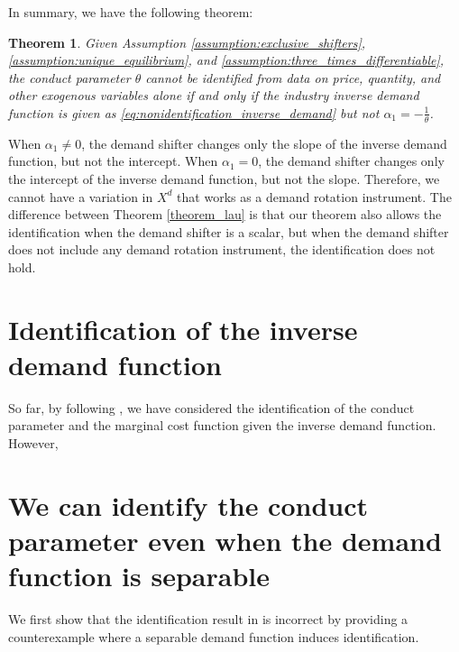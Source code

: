 \documentclass[11pt, a4paper]{article}
\newtheorem{theorem}{Theorem}
\theoremstyle{remark}
\begin{document}
In summary, we have the following theorem:
\begin{theorem}\label{theorem:identification_characterization}
    Given Assumption \ref{assumption:exclusive_shifters}, \ref{assumption:unique_equilibrium}, and \ref{assumption:three_times_differentiable}, the conduct parameter $\theta$ cannot be identified from data on price, quantity, and other exogenous variables alone if and only if the industry inverse demand function is given as \eqref{eq:nonidentification_inverse_demand} but not $\alpha_1 = -\frac{1}{\theta}$.
\end{theorem}
When $\alpha_1 \ne 0$, the demand shifter changes only the slope of the inverse demand function, but not the intercept.
When $\alpha_1 = 0$, the demand shifter changes only the intercept of the inverse demand function, but not the slope.
Therefore, we cannot have a variation in $X^{d}$ that works as a demand rotation instrument.
The difference between Theorem \ref{theorem_lau} is that our theorem also allows the identification when the demand shifter is a scalar, but when the demand shifter does not include any demand rotation instrument, the identification does not hold.






\section{Identification of the inverse demand function}

So far, by following \citet{lau1982identifying}, we have considered the identification of the conduct parameter and the marginal cost function given the inverse demand function.
However, 





\section{We can identify the conduct parameter even when the demand function is separable}\label{sec:identification_example}





We first show that the identification result in \citet{lau1982identifying} is incorrect by providing a counterexample where a separable demand function induces identification.
\end{document}
